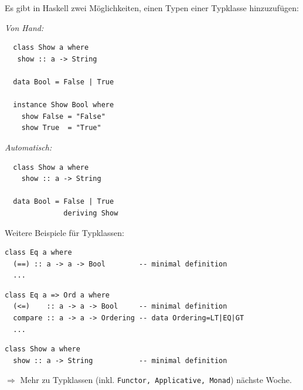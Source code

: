 \documentclass[unknownkeysallowed]{beamer}
\begin{document}
  
  \begin{frame}[fragile]
  
  Es gibt in Haskell zwei Möglichkeiten, einen Typen einer Typklasse hinzuzufügen:\pause  
  
  \begin{multicols}{2}
  \emph{Von Hand:}
  
  \begin{verbatim}
  class Show a where
   show :: a -> String
  
  data Bool = False | True

  instance Show Bool where
    show False = "False"
    show True  = "True"
  \end{verbatim}
  
  \pause
  \columnbreak  
  \emph{Automatisch:}
  
  \begin{verbatim}
  class Show a where
    show :: a -> String  
  
  data Bool = False | True 
              deriving Show
  \end{verbatim}
  \end{multicols} 
  
\end{frame}


  \begin{frame}[fragile]
  
  Weitere Beispiele für Typklassen: \pause

  \begin{verbatim}
class Eq a where
  (==) :: a -> a -> Bool        -- minimal definition
  ...
  \end{verbatim}
  
  \pause
  
  \begin{verbatim}
class Eq a => Ord a where
  (<=)    :: a -> a -> Bool     -- minimal definition
  compare :: a -> a -> Ordering -- data Ordering=LT|EQ|GT
  ...
  \end{verbatim}
  
  \pause
  
  \begin{verbatim}
class Show a where
  show :: a -> String           -- minimal definition
  \end{verbatim}
  
  \pause
  
  $\Rightarrow$ Mehr zu Typklassen (inkl. \texttt{Functor, Applicative, Monad}) 
  nächste Woche.

\end{frame}
\end{document}
